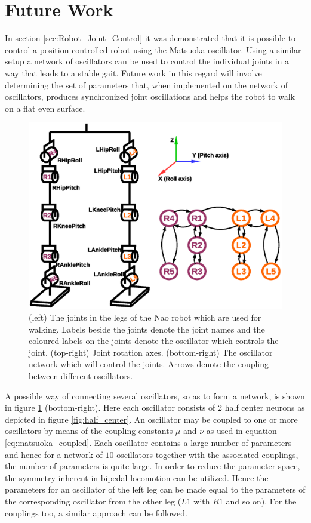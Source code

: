 \documentclass[12pt,twoside]{article}
\theoremstyle{plain}
\theoremstyle{definition}
\theoremstyle{remark}
\newcommand{\forceindent}{\leavevmode{\parindent=2em\indent}}
\begin{document}
\section{Future Work}
\label{sec:Future_Work}
In section \ref{sec:Robot_Joint_Control} it was demonstrated that it is possible to control a position controlled robot using the Matsuoka oscillator. Using a similar setup a network of oscillators can be used to control the individual joints in a way that leads to a stable gait. Future work in this regard will involve determining the set of parameters that, when implemented on the network of oscillators, produces synchronized joint oscillations and helps the robot to walk on a flat even surface.
\begin{figure}[H]
\centering
\includegraphics[scale=0.5]{figures/future_work_oscillator_network.eps}
\caption{(left) The joints in the legs of the Nao robot which are used for walking. Labels beside the joints denote the joint names and the coloured labels on the joints denote the oscillator which controls the joint. (top-right) Joint rotation axes. (bottom-right) The oscillator network which will  control the joints. Arrows denote the coupling between different oscillators.}
\label{fig:future_work}
\end{figure}
\forceindent A possible way of connecting several oscillators, so as to form a network, is shown in figure \ref{fig:future_work} (bottom-right). Here each oscillator consists of 2 half center neurons as depicted in figure \ref{fig:half_center}. An oscillator may be coupled to one or more oscillators by means of the coupling constants $\mu$ and $\nu$ as used in equation \ref{eq:matsuoka_coupled}. Each oscillator contains a large number of parameters and hence for a network of $10$ oscillators together with the associated couplings, the number of parameters is quite large. In order to reduce the parameter space, the symmetry inherent in bipedal locomotion can be utilized. Hence the parameters for an oscillator of the left leg can be made equal to the parameters of the corresponding oscillator from the other leg ($L1$ with $R1$ and so on). For the couplings too, a similar approach can be followed.\\
\end{document}
